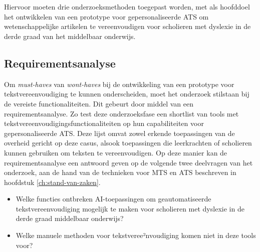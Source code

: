 
\chapter{}%
\label{ch:methodologie}


Hiervoor moeten drie onderzoeksmethoden toegepast worden, met als hoofddoel het ontwikkelen van een prototype voor gepersonaliseerde ATS om wetenschappelijke artikelen te vereenvoudigen voor scholieren met dyslexie in de derde graad van het middelbaar onderwijs.

\section{Requirementsanalyse}
\label{sec:requirementsanalyse}

Om \textit{must-haves} van \textit{wont-haves} bij de ontwikkeling van een prototype voor tekstvereenvoudiging te kunnen onderscheiden, moet het onderzoek stilstaan bij de vereiste functionaliteiten. Dit gebeurt door middel van een requirementsanalyse. Zo test deze onderzoeksfase een shortlist van tools met tekstvereenvoudigingsfunctionaliteiten op hun capabiliteiten voor gepersonaliseerde ATS. Deze lijst omvat zowel erkende toepassingen van de overheid gericht op deze casus, alsook toepassingen die leerkrachten of scholieren kunnen gebruiken om teksten te vereenvoudigen. Op deze manier kan de requirementsanalyse een antwoord geven op de volgende twee deelvragen van het onderzoek, aan de hand van de technieken voor MTS en ATS beschreven in hoofdstuk \ref{ch:stand-van-zaken}.

\begin{itemize}
	\item Welke functies ontbreken AI-toepassingen om geautomatiseerde tekstvereenvoudiging mogelijk te maken voor scholieren met dyslexie in de derde graad middelbaar onderwijs?
	\item Welke manuele methoden voor tekstveree²nvoudiging komen niet in deze tools voor?
\end{itemize}

